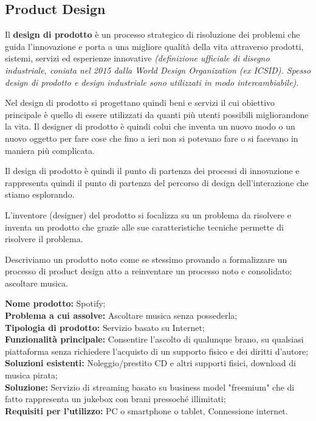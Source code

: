 \subsection{Product Design}
Il \textbf{design di prodotto} è un processo strategico di risoluzione dei problemi che guida l'innovazione e porta a una migliore qualità della vita attraverso prodotti, sistemi, servizi ed esperienze innovative \textit{(definizione ufficiale di disegno industriale, coniata nel 2015 dalla World Design Organization (ex ICSID). Spesso design di prodotto e design industriale sono utilizzati in modo intercambiabile)}. 

Nel design di prodotto si progettano quindi beni e servizi il cui obiettivo principale è quello di essere utilizzati da quanti più utenti possibili migliorandone la vita. Il designer di prodotto è quindi colui che inventa un nuovo modo o un nuovo oggetto per fare cose che fino a ieri non si potevano fare o si facevano in maniera più complicata.

Il design di prodotto è quindi il punto di partenza dei processi di innovazione e rappresenta quindi il punto di partenza del percorso di design dell'interazione che stiamo esplorando.

L'inventore (designer) del prodotto si focalizza su un problema da risolvere e inventa un prodotto che grazie alle sue caratteristiche tecniche permette di risolvere il problema.

Descriviamo un prodotto noto come se stessimo provando a formalizzare un processo di product design atto a reinventare un processo noto e consolidato: ascoltare musica. 

\begin{flushleft}
\textbf{Nome prodotto:} Spotify;\\
\textbf{Problema a cui assolve:} Ascoltare musica senza possederla;\\
\textbf{Tipologia di prodotto:} Servizio basato su Internet;\\
\textbf{Funzionalità principale:} Consentire l'ascolto di qualunque brano, su qualsiasi piattaforma senza richiedere l'acquisto di un supporto fisico e dei diritti d'autore;\\
\textbf{Soluzioni esistenti:} Noleggio/prestito CD e altri supporti fisici, download di musica pirata;\\
\textbf{Soluzione:} Servizio di streaming basato su business model "freemium" che di fatto rappresenta un jukebox con brani pressoché illimitati;\\
\textbf{Requisiti per l'utilizzo:} PC o smartphone o tablet, Connessione internet. 
\end{flushleft}

